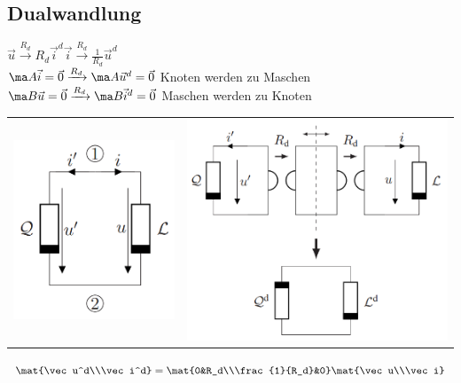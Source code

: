 \documentclass[fs, footer]{latex4ei}
\begin{document}
\begin{multicols*}{4}
    \subsection{Dualwandlung}
    $\vec u \xrightarrow{R_d} R_d\vec i^d$\qquad$\vec i \xrightarrow{R_d} \frac{1}{R_d}\vec u^d$\\
    $\ma A\vec i = \vec 0 \xrightarrow{R_d} \ma A\vec u^d = \vec 0$ Knoten werden zu Maschen\\
    $\ma B\vec u = \vec 0 \xrightarrow{R_d} \ma B\vec i^d = \vec 0$ Maschen werden zu Knoten\\
    \begin{tabular}{cc}
        \includegraphics[width=.295\columnwidth]{img/dual_start} &
        \includegraphics[width=.595\columnwidth]{img/dual_end}
    \end{tabular}
    $\mat{\vec u^d\\\vec i^d}=\mat{0&R_d\\\frac{1}{R_d}&0}\mat{\vec u\\\vec i}$


\end{multicols*}
\end{document}
